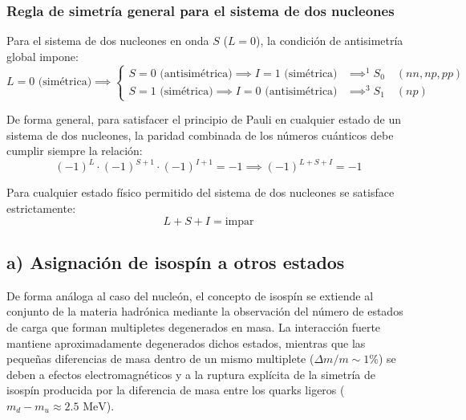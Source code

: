 \subsubsection*{Regla de simetría general para el sistema de dos nucleones}

Para el sistema de dos nucleones en onda $S$ ($L=0$), la condición de antisimetría global impone:
\begin{equation}
    L=0 \text{ (simétrica)} \implies \begin{cases}
        S=0 \text{ (antisimétrica)} \implies I=1 \text{ (simétrica)} &\implies ^1S_0 \quad (nn, np, pp) \\
        S=1 \text{ (simétrica)} \implies I=0 \text{ (antisimétrica)} &\implies ^3S_1 \quad (np)
    \end{cases}
\end{equation}

De forma general, para satisfacer el principio de Pauli en cualquier estado de un sistema de dos nucleones, la paridad combinada de los números cuánticos debe cumplir siempre la relación:
\begin{equation}
    (-1)^L \cdot (-1)^{S+1} \cdot (-1)^{I+1} = -1 \implies (-1)^{L+S+I} = -1
\end{equation}
\begin{concepto}
Para cualquier estado físico permitido del sistema de dos nucleones se satisface estrictamente:
\begin{equation}
    L + S + I = \text{impar}
\end{equation}
\end{concepto}

\newpage

\subsection*{a) Asignación de isospín a otros estados}

De forma análoga al caso del nucleón, el concepto de isospín se extiende al conjunto de la materia hadrónica mediante la observación del número de estados de carga que forman multipletes degenerados en masa. La interacción fuerte mantiene aproximadamente degenerados dichos estados, mientras que las pequeñas diferencias de masa dentro de un mismo multiplete ($\Delta m / m \sim 1\%$) se deben a efectos electromagnéticos y a la ruptura explícita de la simetría de isospín producida por la diferencia de masa entre los quarks ligeros ($m_d - m_u \approx 2.5\text{ MeV}$).


